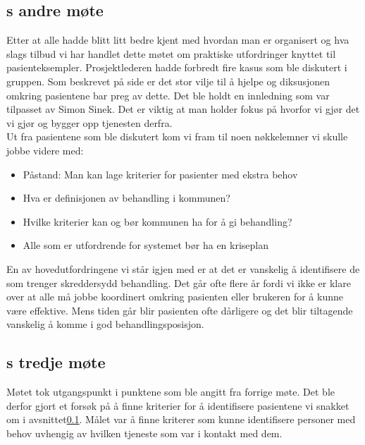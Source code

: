 \documentclass[11pt]{report} %
\begin{document}
                  \subsection{s andre møte}\label{sec:agr_2}
                    Etter at alle hadde blitt litt bedre kjent med hvordan man er organisert og hva slags tilbud vi har handlet dette møtet om praktiske utfordringer knyttet til pasienteksempler. Prosjektlederen hadde forbredt fire kasus som ble diskutert i gruppen. Som beskrevet på side \pageref{stor_vilje_til_hjelp} er det stor vilje til å hjelpe og diksusjonen omkring pasientene bar preg av dette\cite{arbgr_mref-2}. Det ble holdt en innledning som var tilpasset av Simon Sinek\cite{sinek09}. Det er viktig at man holder fokus på hvorfor vi gjør det vi gjør og bygger opp tjenesten derfra. \\
                    Ut fra pasientene som ble diskutert kom vi fram til noen nøkkelemner vi skulle jobbe videre med:\\
                      \begin{itemize}
                        \item Påstand: Man kan lage kriterier for pasienter med ekstra behov\\
                        \item Hva er definisjonen av behandling i kommunen?\\
                        \item Hvilke kriterier kan og bør kommunen ha for å gi behandling?\\
                        \item Alle som er utfordrende for systemet bør ha en kriseplan\\
                      \end{itemize}
                    En av hovedutfordringene vi står igjen med er at det er vanskelig å identifisere de som trenger skreddersydd behandling. Det går ofte flere år fordi vi ikke er klare over at alle må jobbe koordinert omkring pasienten eller brukeren for å kunne være effektive. Mens tiden går blir pasienten ofte dårligere og det blir tiltagende vanskelig å komme i god behandlingsposisjon.   

                  \subsection{s tredje møte}\label{sec:agr_3}
                    Møtet tok utgangspunkt i punktene som ble angitt fra forrige møte\cite{arbgr_mref-2}. Det ble derfor gjort et forsøk på å finne kriterier for å identifisere pasientene vi snakket om i avsnittet\ref{sec:agr_2}. Målet var å finne kriterer som kunne identifisere personer med behov uvhengig av hvilken tjeneste som var i kontakt med dem. \\
\end{document}
